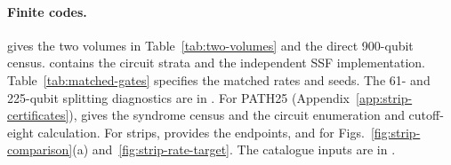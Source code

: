 \documentclass[10pt,twocolumn]{article}
\theoremstyle{definition}
\begin{document}
\paragraph{Finite codes.}
 gives the two volumes in
Table~\ref{tab:two-volumes} and the direct 900-qubit census.
 contains the circuit strata and the independent
SSF implementation. Table~\ref{tab:matched-gates} specifies the
matched rates and seeds. The 61- and 225-qubit splitting diagnostics
are in .
For PATH25 (Appendix~\ref{app:strip-certificates}),
 gives the syndrome census and
 the circuit enumeration
and cutoff-eight calculation. For strips,
 provides the endpoints,
 and  for
Figs.~\ref{fig:strip-comparison}(a) and~\ref{fig:strip-rate-target}.
The catalogue inputs are in .
\par\endgroup
\end{document}
